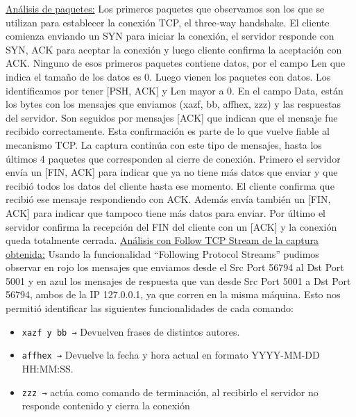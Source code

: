 \documentclass[12pt]{article} %
\begin{document}
\underline {Análisis de paquetes:}
Los primeros paquetes que observamos son los que se utilizan para establecer la conexión TCP, el three‑way handshake.
\newline
\newline
El cliente comienza enviando un SYN para iniciar la conexión, el servidor responde con SYN, ACK para aceptar la conexión y luego cliente confirma la aceptación con ACK. Ninguno de esos primeros paquetes contiene datos, por el campo Len que indica el tamaño de los datos es 0.
\newline
\newline
Luego vienen los paquetes con datos. Los identificamos por tener [PSH, ACK] y Len mayor a 0. En el campo Data, están los bytes con los mensajes que enviamos (xazf, bb, affhex, zzz) y las respuestas del servidor. Son seguidos por mensajes [ACK] que indican que el mensaje fue recibido correctamente. Esta confirmación es parte de lo que vuelve fiable al mecanismo TCP.
\newline
\newline
La captura continúa con este tipo de mensajes, hasta los últimos 4 paquetes que corresponden al cierre de conexión. Primero el servidor envía un  [FIN, ACK] para indicar que ya no tiene más datos que enviar y que recibió todos los datos del cliente hasta ese momento. El cliente confirma que recibió ese mensaje respondiendo con ACK. Además envía también un  [FIN, ACK] para indicar que tampoco tiene más datos para enviar. Por último el servidor confirma la recepción del FIN del cliente con un [ACK] y la conexión queda totalmente cerrada.
\newline
\newline
\underline {Análisis con Follow TCP Stream de la captura obtenida:}
Usando la funcionalidad  “Following Protocol Streams” pudimos observar en rojo los mensajes que enviamos desde el Src Port 56794 al Dst Port 5001 y en azul los mensajes de respuesta que van desde Src Port 5001 a Dst Port 56794, ambos de la IP 127.0.0.1, ya que corren en la misma máquina. Esto nos permitió identificar las siguientes funcionalidades de cada comando:

\begin{itemize}
    \item\texttt{xazf y bb →} Devuelven frases de distintos autores.
    \item\texttt{affhex →} Devuelve la fecha y hora actual en formato YYYY-MM-DD HH:MM:SS.
    \item\texttt{zzz →} actúa como comando de terminación, al recibirlo el servidor no responde contenido y cierra la conexión 
\end{itemize}
 
\end{document}
